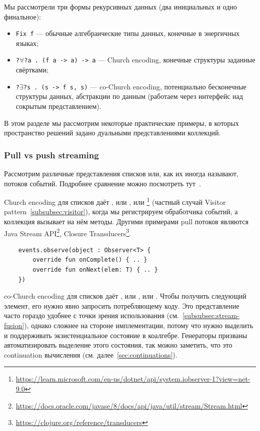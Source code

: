 Мы рассмотрели три формы рекурсивных данных (два инициальных и одно финальное):
\begin{itemize}
    \item \texttt{Fix f} --- обычные алгебраические типы данных, конечные в энергичных языках;
    \item \texttt{?$\forall$?a . (f a -> a) -> a} --- Church encoding, конечные структуры заданные свёртками;
    \item \texttt{?$\exists$?s . (s -> f s, s)} --- co-Church encoding, потенциально бесконечные структуры данных, абстракции по данным (работаем через интерфейс над сокрытым представлением).
\end{itemize}

В этом разделе мы рассмотрим некоторые практические примеры, в которых пространство решений задано дуальными представлениями коллекций.

\subsubsection{Pull vs push streaming} \label{subsubsec:push-pull}

Рассмотрим различные представления списков или, как их иногда называют, потоков событий.
Подробнее сравнение можно посмотреть тут~\cite[параграф 3]{kiselyov2017stream}.

Church encoding для списков даёт , или , или \footnote{\url{https://learn.microsoft.com/en-us/dotnet/api/system.iobserver-1?view=net-9.0}} (частный случай Visitor pattern~\ref{subsubsec:visitor}), когда мы регистрируем обработчика событий, а коллекция вызывает на нём методы.
Другими примерами pull потоков являются Java Stream API\footnote{\url{https://docs.oracle.com/javase/8/docs/api/java/util/stream/Stream.html}}, Closure Transducers\footnote{\url{https://clojure.org/reference/transducers}}.
\begin{verbatim}
    events.observe(object : Observer<T> {
        override fun onComplete() { .. }
        override fun onNext(elem: T) { .. }
    })
\end{verbatim}

co-Church encoding для списков даёт , или , или .
Чтобы получить следующий элемент, его нужно явно запросить потребляющему коду.
Это представление часто гораздо удобнее с точки зрения использования (см.~\ref{subsubsec:stream-fusion}), однако сложнее на стороне имплементации, потому что нужно выделить и поддерживать экзистенциальное состояние в коалгебре.
Генераторы призваны автоматизировать выделение этого состояния, так можно заметить, что это continuation вычисления (см. далее~\ref{sec:continuations}).

